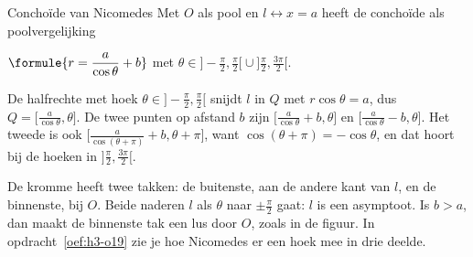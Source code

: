 \begin{theorie}
\begin{minipage}[t]{.6\linewidth}
\vspace{0pt}
\begin{stelling}{Conchoïde van Nicomedes}
Met $O$ als pool en $l \leftrightarrow x = a$ heeft de conchoïde als poolvergelijking

\vspace{1mm}
\qquad $\formule{r = \dfrac{a}{\cos\theta} + b}$ \quad met $\theta \in \bigl]-\tfrac{\pi}{2}, \tfrac{\pi}{2}\bigr[ \cup \bigl]\tfrac{\pi}{2}, \tfrac{3\pi}{2}\bigr[$.
\end{stelling}

\begin{bewijs}
De halfrechte met hoek $\theta \in \bigl]-\tfrac{\pi}{2}, \tfrac{\pi}{2}\bigr[$ snijdt $l$ in $Q$ met $r\cos\theta = a$, dus $Q = \bigl[\tfrac{a}{\cos\theta}, \theta\bigr]$. De twee punten op afstand $b$ zijn $\bigl[\tfrac{a}{\cos\theta} + b, \theta\bigr]$ en $\bigl[\tfrac{a}{\cos\theta} - b, \theta\bigr]$. Het tweede is ook $\bigl[\tfrac{a}{\cos(\theta + \pi)} + b, \theta + \pi\bigr]$, want $\cos(\theta + \pi) = -\cos\theta$, en dat hoort bij de hoeken in $\bigl]\tfrac{\pi}{2}, \tfrac{3\pi}{2}\bigr[$.
\end{bewijs}
\end{minipage}\hfill
\begin{minipage}[t]{.36\linewidth}
\vspace{2mm}
\centering
{}
\end{minipage}
\end{theorie}

De kromme heeft twee takken: de buitenste, aan de andere kant van $l$, en de binnenste, bij $O$. Beide naderen $l$ als $\theta$ naar $\pm\tfrac{\pi}{2}$ gaat: $l$ is een asymptoot. Is $b > a$, dan maakt de binnenste tak een lus door $O$, zoals in de figuur. In opdracht~\ref{oef:h3-o19} zie je hoe Nicomedes er een hoek mee in drie deelde.

